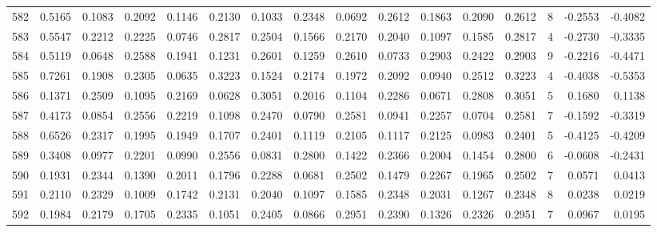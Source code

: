 \begin{tabular}{lrrrrrrrrrrrrrrr}
582 &      0.5165 &  0.1083 &  0.2092 &  0.1146 &  0.2130 &  0.1033 &  0.2348 &  0.0692 &  0.2612 &  0.1863 &   0.2090 &     0.2612 &      8 &                   -0.2553 &                    -0.4082 \\
583 &      0.5547 &  0.2212 &  0.2225 &  0.0746 &  0.2817 &  0.2504 &  0.1566 &  0.2170 &  0.2040 &  0.1097 &   0.1585 &     0.2817 &      4 &                   -0.2730 &                    -0.3335 \\
584 &      0.5119 &  0.0648 &  0.2588 &  0.1941 &  0.1231 &  0.2601 &  0.1259 &  0.2610 &  0.0733 &  0.2903 &   0.2422 &     0.2903 &      9 &                   -0.2216 &                    -0.4471 \\
585 &      0.7261 &  0.1908 &  0.2305 &  0.0635 &  0.3223 &  0.1524 &  0.2174 &  0.1972 &  0.2092 &  0.0940 &   0.2512 &     0.3223 &      4 &                   -0.4038 &                    -0.5353 \\
586 &      0.1371 &  0.2509 &  0.1095 &  0.2169 &  0.0628 &  0.3051 &  0.2016 &  0.1104 &  0.2286 &  0.0671 &   0.2808 &     0.3051 &      5 &                    0.1680 &                     0.1138 \\
587 &      0.4173 &  0.0854 &  0.2556 &  0.2219 &  0.1098 &  0.2470 &  0.0790 &  0.2581 &  0.0941 &  0.2257 &   0.0704 &     0.2581 &      7 &                   -0.1592 &                    -0.3319 \\
588 &      0.6526 &  0.2317 &  0.1995 &  0.1949 &  0.1707 &  0.2401 &  0.1119 &  0.2105 &  0.1117 &  0.2125 &   0.0983 &     0.2401 &      5 &                   -0.4125 &                    -0.4209 \\
589 &      0.3408 &  0.0977 &  0.2201 &  0.0990 &  0.2556 &  0.0831 &  0.2800 &  0.1422 &  0.2366 &  0.2004 &   0.1454 &     0.2800 &      6 &                   -0.0608 &                    -0.2431 \\
590 &      0.1931 &  0.2344 &  0.1390 &  0.2011 &  0.1796 &  0.2288 &  0.0681 &  0.2502 &  0.1479 &  0.2267 &   0.1965 &     0.2502 &      7 &                    0.0571 &                     0.0413 \\
591 &      0.2110 &  0.2329 &  0.1009 &  0.1742 &  0.2131 &  0.2040 &  0.1097 &  0.1585 &  0.2348 &  0.2031 &   0.1267 &     0.2348 &      8 &                    0.0238 &                     0.0219 \\
592 &      0.1984 &  0.2179 &  0.1705 &  0.2335 &  0.1051 &  0.2405 &  0.0866 &  0.2951 &  0.2390 &  0.1326 &   0.2326 &     0.2951 &      7 &                    0.0967 &                     0.0195 \\

\end{tabular}
